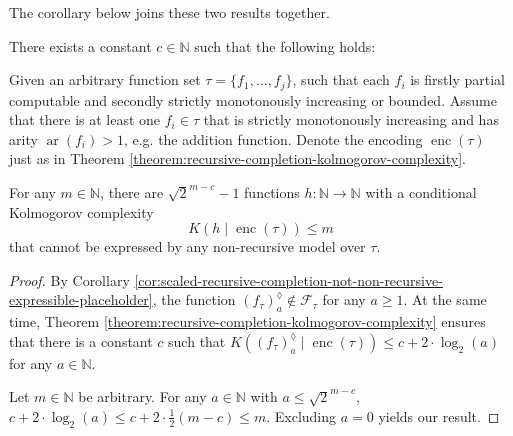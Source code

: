 The corollary below joins these two results together.



\begin{corollary}
	\label{cor:recursive-completion-models-cannot-express}
	There exists a constant $c\in\mathbb{N}$ such that the following holds:
	
	Given an arbitrary function set $\tau=\{f_1,\dots,f_j\}$, such that each $f_i$ is firstly partial computable and secondly strictly monotonously increasing or bounded. Assume that there is at least one $f_i\in\tau$ that is strictly monotonously increasing and has arity $\operatorname{ar}(f_i)>1$, e.g. the addition function.
	Denote the encoding $\operatorname{enc}(\tau)$ just as in Theorem \ref{theorem:recursive-completion-kolmogorov-complexity}.
	
	For any $m\in\mathbb{N}$, there are $\sqrt{2}^{m-c}-1$ functions $h:\mathbb{N}\to\mathbb{N}$ with a conditional Kolmogorov complexity 
	\begin{equation*}
		K(h\mid \operatorname{enc}(\tau))\leq m
	\end{equation*}
	that cannot be expressed by any non-recursive model over $\tau$.
	
\end{corollary}
\begin{proof}
	By Corollary \ref{cor:scaled-recursive-completion-not-non-recursive-expressible-placeholder}, the function $\left(f_\tau\right)_a^{\lozenge}\notin\mathcal{F}_{\tau}$ for any $a\geq 1$.
	At the same time, Theorem \ref{theorem:recursive-completion-kolmogorov-complexity} ensures that there is a constant $c$ such that $K(\left(f_{\tau}\right)_{a}^{\lozenge}\mid \operatorname{enc}(\tau))\leq c+2\cdot\log_2(a)$ for any $a\in \mathbb{N}$.
	
	Let $m\in\mathbb{N}$ be arbitrary.
	For any $a\in\mathbb{N}$ with $a\leq \sqrt{2}^{m-c}$, $c+2\cdot\log_2(a)\leq  c + 2 \cdot \frac{1}{2}(m-c)\leq m$.
	Excluding $a=0$ yields our result.
\end{proof}

